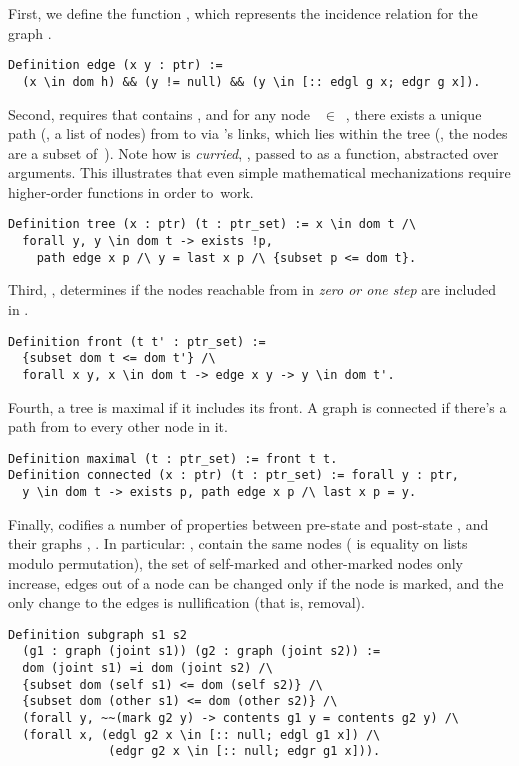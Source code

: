 First, we define the function , which represents the
incidence relation for the graph .
%
\begin{lstlisting}
Definition edge (x y : ptr) := 
  (x \in dom h) && (y != null) && (y \in [:: edgl g x; edgr g x]).
\end{lstlisting}
Second,  requires that  contains , and
for any node ~$\in$~, there exists a unique path (\ie,
a list of nodes)  from  to  via 's
links, which lies within the tree (\ie, the nodes  are a subset
of~). Note how  is \emph{curried}, \ie, passed to
 as a function, abstracted over arguments. This illustrates
that even simple mathematical mechanizations require higher-order
functions in order to~work.
%
\begin{lstlisting}
Definition tree (x : ptr) (t : ptr_set) := x \in dom t /\
  forall y, y \in dom t -> exists !p, 
    path edge x p /\ y = last x p /\ {subset p <= dom t}.   
\end{lstlisting} 
%
%
Third, , determines if the nodes reachable from
\code{t} in \emph{zero or one step} are included in \code{t'}.
%
\begin{lstlisting}
Definition front (t t' : ptr_set) :=
  {subset dom t <= dom t'} /\
  forall x y, x \in dom t -> edge x y -> y \in dom t'. 
\end{lstlisting}
%
Fourth, a tree  is maximal if it includes its front. A graph
is connected if there's a path from  to every other node in it.
\begin{lstlisting}
Definition maximal (t : ptr_set) := front t t.
Definition connected (x : ptr) (t : ptr_set) := forall y : ptr, 
  y \in dom t -> exists p, path edge x p /\ last x p = y.
\end{lstlisting}
%
Finally,  codifies a number of properties between
pre-state  and post-state , and their graphs
\code{g1}, \code{g2}. In particular: \code{g1}, \code{g2} contain the
same nodes (\code{=i} is equality on lists modulo permutation), the
set of self-marked and other-marked nodes only increase, edges out of
a node \code{y} can be changed only if the node is marked, and the
only change to the edges is nullification (that is, removal).
\begin{lstlisting}
Definition subgraph s1 s2 
  (g1 : graph (joint s1)) (g2 : graph (joint s2)) :=
  dom (joint s1) =i dom (joint s2) /\
  {subset dom (self s1) <= dom (self s2)} /\
  {subset dom (other s1) <= dom (other s2)} /\
  (forall y, ~~(mark g2 y) -> contents g1 y = contents g2 y) /\
  (forall x, (edgl g2 x \in [:: null; edgl g1 x]) /\
              (edgr g2 x \in [:: null; edgr g1 x])).
\end{lstlisting}

